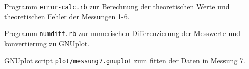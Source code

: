 \documentclass[a4paper,german,12pt,smallheadings]{scrartcl}
\begin{document}
Programm \texttt{error-calc.rb} zur Berechnung der theoretischen Werte und
theoretischen Fehler der Messungen 1-6.



Programm \texttt{numdiff.rb} zur numerischen Differenzierung der Messwerte und
konvertierung zu GNUplot.


GNUplot script \texttt{plot/messung7.gnuplot} zum fitten der Daten in Messung 7.

\end{document}
